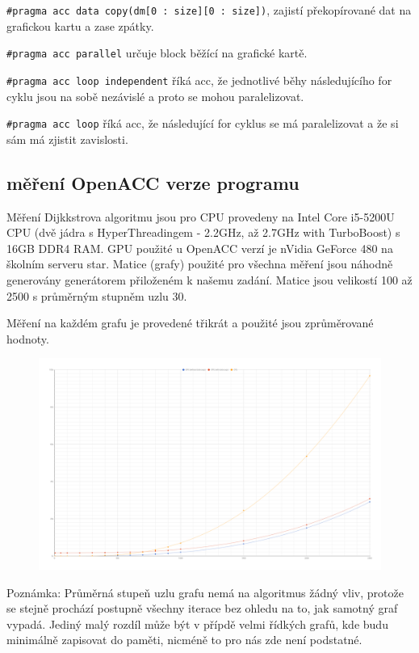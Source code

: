 \documentclass[11pt, fleqn]{article}
\begin{document}
\lstinline{#pragma acc data copy(dm[0 : size][0 : size])}, zajistí překopírované dat na grafickou kartu a zase zpátky.

\lstinline{#pragma acc parallel} určuje block běžící na grafické kartě.

\lstinline{#pragma acc loop independent} říká acc, že jednotlivé běhy následujícího for cyklu jsou na sobě nezávislé a proto se mohou paralelizovat.

\lstinline{#pragma acc loop} říká acc, že následující for cyklus se má paralelizovat a že si sám má zjistit zavislosti.


\subsection{měření OpenACC verze programu}

Měření Dijkkstrova algoritmu jsou pro CPU provedeny na Intel Core i5-5200U CPU (dvě jádra s HyperThreadingem - 2.2GHz, až 2.7GHz with TurboBoost) s 16GB DDR4 RAM. GPU použité u OpenACC verzí je nVidia GeForce 480 na školním serveru star. Matice (grafy) použité pro všechna měření jsou náhodně generovány generátorem přiloženém k našemu zadání. Matice jsou velikostí 100 až 2500 s průměrným stupněm uzlu 30.

Měření na každém grafu je provedené třikrát a použité jsou zprůměrované hodnoty.

\begin{figure}
  \centering
  \includegraphics[width=.7\linewidth]{../results/Dijkstra.png}
  \label{fig:d1}
\end{figure}

Poznámka: Průměrná stupeň uzlu grafu nemá na algoritmus žádný vliv, protože se stejně prochází postupně všechny iterace bez ohledu na to, jak samotný graf vypadá. Jediný malý rozdíl může být v přípdě velmi řídkých grafů, kde budu minimálně zapisovat do paměti, nicméně to pro nás zde není podstatné.
\end{document}

